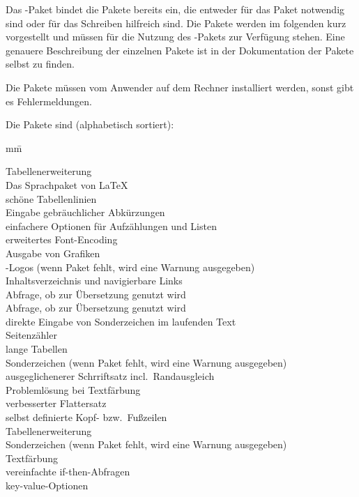Das -Paket bindet die Pakete bereits ein, die entweder für das Paket notwendig sind oder für das Schreiben hilfreich sind.
Die Pakete werden im folgenden kurz vorgestellt und müssen für die Nutzung des -Pakets zur Verfügung stehen.
Eine genauere Beschreibung der einzelnen Pakete ist in der Dokumentation der Pakete selbst zu finden.

Die Pakete müssen vom Anwender auf dem Rechner installiert werden, sonst gibt es Fehlermeldungen.

Die Pakete sind (alphabetisch sortiert):
\begin{tabbing}
	mm\=\kill

	\>Tabellenerweiterung\\
	\>Das Sprachpaket von \LaTeX\\
	\>schöne Tabellenlinien\\
	\>Eingabe gebräuchlicher Abkürzungen\\
	\>einfachere Optionen für Aufzählungen und Listen\\
	\>erweitertes Font-Encoding\\
	\>Ausgabe von Grafiken\\
	\>-Logos (wenn Paket fehlt, wird eine Warnung ausgegeben)\\
	\>Inhaltsverzeichnis und navigierbare Links\\
	\>Abfrage, ob  zur Übersetzung genutzt wird\\
	\>Abfrage, ob  zur Übersetzung genutzt wird\\
	\>direkte Eingabe von Sonderzeichen im laufenden Text\\
	\>Seitenzähler\\
	\>lange Tabellen\\
	\>Sonderzeichen (wenn Paket fehlt, wird eine Warnung ausgegeben)\\
	\>ausgeglichenerer Schrriftsatz incl.\ Randausgleich\\
	\>Problemlösung bei Textfärbung\\
	\>verbesserter Flattersatz\\
	\>selbst definierte Kopf- bzw.\ Fußzeilen\\
	\>Tabellenerweiterung\\
	\>Sonderzeichen (wenn Paket fehlt, wird eine Warnung ausgegeben)\\
	\>Textfärbung\\
	\>vereinfachte if-then-Abfragen\\
	\>key-value-Optionen
\end{tabbing}

